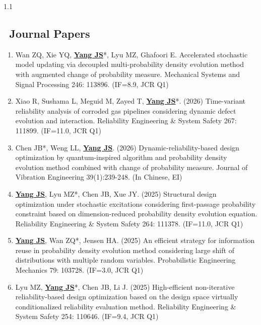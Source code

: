 \documentclass{resume}
\begin{document}
\begin{spacing}{1.1}
\subsection{\faFile*\,\; \textbf{Journal Papers}}
\vspace{10pt}
\begin{enumerate} [itemsep=3pt,topsep=2pt]

  \item Wan ZQ, Xie YQ, \underline{\textbf{Yang JS}}*, Lyu MZ, Ghafoori E. Accelerated stochastic model updating via decoupled multi-probability density evolution method with augmented change of probability measure. Mechanical Systems and Signal Processing 246: 113896. (IF=8.9, JCR Q1)

  \item Xiao R, Sushama L, Meguid M, Zayed T, \underline{\textbf{Yang JS}}*. (2026) Time-variant reliability analysis of corroded gas pipelines considering dynamic defect evolution and interaction. Reliability Engineering \& System Safety 267: 111899. (IF=11.0, JCR Q1)

  \item Chen JB*, Weng LL, \underline{\textbf{Yang JS}}. (2026) Dynamic-reliability-based design optimization by quantum-inspired algorithm and probability density evolution method combined with change of probability measure. Journal of Vibration Engineering 39(1):239-248. (In Chinese, EI)

  \item \underline{\textbf{Yang JS}}, Lyu MZ*, Chen JB, Xue JY. (2025) Structural design optimization under stochastic excitations considering first-passage probability constraint based on dimension-reduced probability density evolution equation. Reliability Engineering \& System Safety 264: 111378. (IF=11.0, JCR Q1)
  
  \item \underline{\textbf{Yang JS}}, Wan ZQ*, Jensen HA. (2025) An efficient strategy for information reuse in probability density evolution method considering large shift of distributions with multiple random variables. Probabilistic Engineering Mechanics 79: 103728. (IF=3.0, JCR Q1)
  
  \item Lyu MZ, \underline{\textbf{Yang JS}}*, Chen JB, Li J. (2025) High-efficient non-iterative reliability-based design optimization based on the design space virtually conditionalized reliability evaluation method. Reliability Engineering \& System Safety 254: 110646. (IF=9.4, JCR Q1)


\end{enumerate}
\end{spacing}
\end{document}
